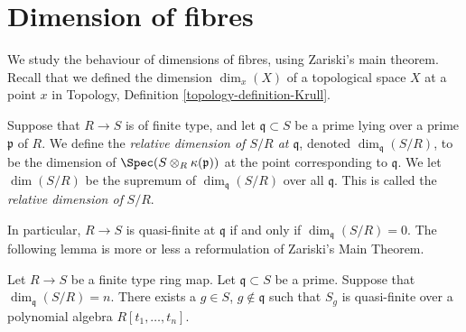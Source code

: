 \section{Dimension of fibres}
\label{section-dimension-fibres}

\noindent
We study the behaviour of dimensions of fibres, using
Zariski's main theorem. Recall that we defined the
dimension $\dim_x(X)$ of a topological space $X$ at a point $x$
in Topology, Definition \ref{topology-definition-Krull}.

\begin{definition}
\label{definition-relative-dimension}
Suppose that $R \to S$ is of finite type, and let
$\mathfrak q \subset S$ be a prime lying over a prime
$\mathfrak p$ of $R$.
We define the {\it relative dimension
of $S/R$ at $\mathfrak q$}, denoted
$\dim_{\mathfrak q}(S/R)$, to be the dimension
of $\Spec(S \otimes_R \kappa(\mathfrak p))$
at the point corresponding to $\mathfrak q$. We let
$\dim(S/R)$ be the supremum of $\dim_{\mathfrak q}(S/R)$
over all $\mathfrak q$. This is called the
{\it relative dimension of} $S/R$.
\end{definition}

\noindent
In particular, $R \to S$ is quasi-finite at $\mathfrak q$ if
and only if $\dim_{\mathfrak q}(S/R) = 0$. The following lemma
is more or less a reformulation of Zariski's Main Theorem.

\begin{lemma}
\label{lemma-quasi-finite-over-polynomial-algebra}
Let $R \to S$ be a finite type ring map.
Let $\mathfrak q \subset S$ be a prime.
Suppose that $\dim_{\mathfrak q}(S/R) = n$.
There exists a $g \in S$, $g \not\in \mathfrak q$
such that $S_g$ is quasi-finite over a
polynomial algebra $R[t_1, \ldots, t_n]$.
\end{lemma}

